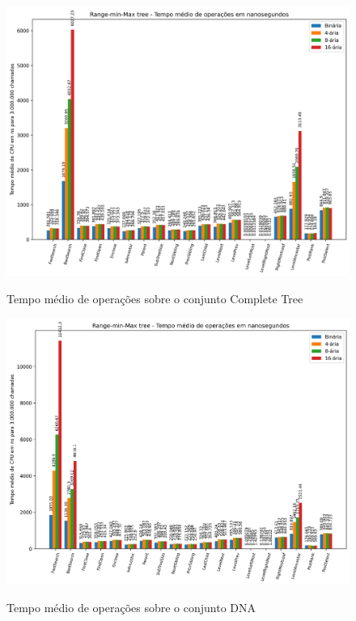 \newpage

\begin{figure}[!ht]
    \centering
      \caption[Operações sobre o conjunto de dado ctree]{Tempo médio de operações sobre o conjunto Complete Tree}{
          \includegraphics[scale=0.8, angle=270]{images/ctree_i3000000.png}
        }
        \label{fig:cstree}
\end{figure}

\begin{figure}[!ht]
    \centering
      \caption[Operações sobre o conjunto de dado dna]{Tempo médio de operações sobre o conjunto DNA}{
          \includegraphics[scale=0.8, angle=270]{images/dna_i3000000.png}
        }
        \label{fig:dna}
\end{figure}

